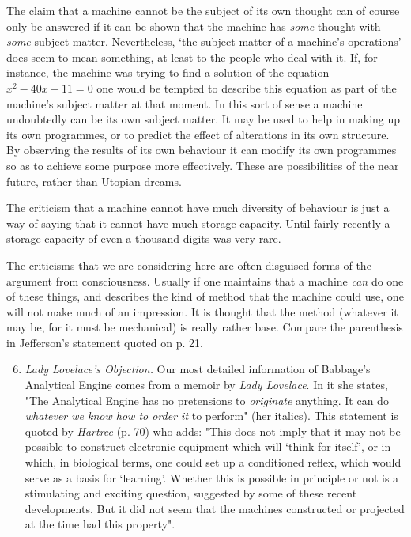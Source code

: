     The claim that a machine cannot be the subject of its own thought can of course only be answered if it can be shown that the machine has \textit{some} thought with \textit{some} subject matter. Nevertheless, ‘the subject matter of a machine's operations' does seem to mean something, at least to the people who deal with it. If, for instance, the machine was trying to find a solution of the equation $x^2 - 40x - 11 = 0$ one would be tempted to describe this equation as part of the machine's subject matter at that moment. In this sort of sense a machine undoubtedly can be its own subject matter. It may be used to help in making up its own programmes, or to predict the effect of alterations in its own structure. By observing the results of its own behaviour it can modify its own programmes so as to achieve some purpose more effectively. These are possibilities of the near future, rather than Utopian dreams.

    The criticism that a machine cannot have much diversity of behaviour is just a way of saying that it cannot have much storage capacity. Until fairly recently a storage capacity of even a thousand digits was very rare.

    The criticisms that we are considering here are often disguised forms of the argument from consciousness. Usually if one maintains that a machine \textit{can} do one of these things, and describes the kind of method that the machine could use, one will not make much of an impression. It is thought that the method (whatever it may be, for it must be mechanical) is really rather base. Compare the parenthesis in Jefferson's statement quoted on p. 21.

    \begin{enumerate}[label=(\arabic*)]
        \setcounter{enumi}{5}
        \item{\textit{Lady Lovelace's Objection.} Our most detailed information of Babbage's Analytical Engine comes from a memoir by \textit{Lady Lovelace}. In it she states, "The Analytical Engine has no pretensions to \textit{originate} anything. It can do \textit{whatever we know how to order it} to perform" (her italics). This statement is quoted by \textit{Hartree} (p. 70) who adds: "This does not imply that it may not be possible to construct electronic equipment which will ‘think for itself', or in which, in biological terms, one could set up a conditioned reflex, which would serve as a basis for ‘learning'. Whether this is possible in principle or not is a stimulating and exciting question, suggested by some of these recent developments. But it did not seem that the machines constructed or projected at the time had this property".}
    \end{enumerate}

